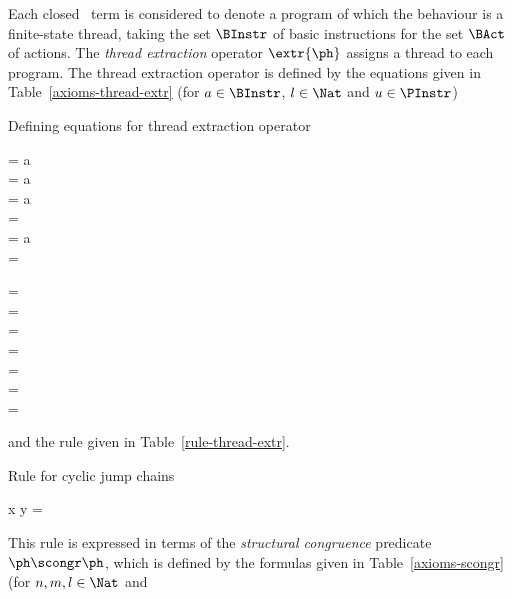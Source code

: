 \documentclass[fleqn]{llncs}
\begin{document}
Each closed \PGA\ term is considered to denote a program of which the
behaviour is a finite-state thread, taking the set $\BInstr$ of basic
instructions for the set $\BAct$ of actions.
The \emph{thread extraction} operator $\extr{\ph}$ assigns a thread to
each program.
The thread extraction operator is defined by the equations given in
Table~\ref{axioms-thread-extr} (for $a \in \BInstr$, $l \in \Nat$ and
$u \in \PInstr$)\begin{table}[!t]
\caption{Defining equations for thread extraction operator}
\label{axioms-thread-extr}
\begin{eqntbl}
\begin{eqncol}
 = a \bapf \DeadEnd \\
 = a \bapf {} \\
 = a \bapf \DeadEnd \\
 =
 \\
 = a \bapf \DeadEnd \\
 =
\end{eqncol}
\qquad
\begin{eqncol}
 = \DeadEnd \\
 = \DeadEnd \\
 =  \\
 = \DeadEnd \\
 =  \\
\extr{\halt} = \Stop \\
 = \Stop
\end{eqncol}
\end{eqntbl}
\end{table}
and the rule given in Table~\ref{rule-thread-extr}.\begin{table}[!t]
\caption{Rule for cyclic jump chains}
\label{rule-thread-extr}
\begin{eqntbl}
\begin{eqncol}
x \scongr {} \conc y \Implies {} = \DeadEnd
\end{eqncol}
\end{eqntbl}
\end{table}
This rule is expressed in terms of the \emph{structural congruence}
predicate $\ph \scongr \ph$, which is defined by the formulas given in
Table~\ref{axioms-scongr} (for $n,m,l \in \Nat$ and
\end{document}
